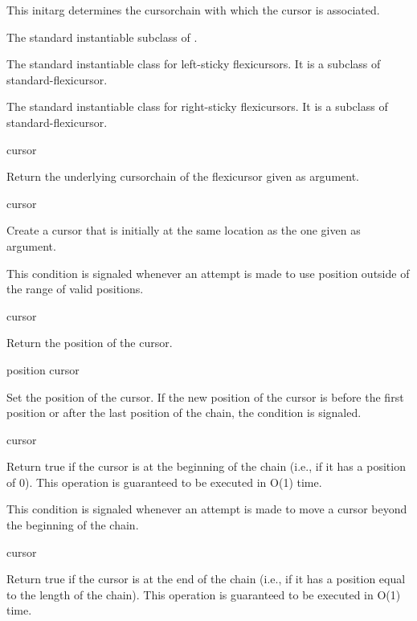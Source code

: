 \documentclass[11pt]{article}
\begin{document}
This initarg determines the cursorchain with which the cursor is associated. 


The standard instantiable subclass of . 


The standard instantiable class for left-sticky flexicursors.  It is a
subclass of standard-flexicursor. 


The standard instantiable class for right-sticky flexicursors.  It is a
subclass of standard-flexicursor. 

 {cursor}

Return the underlying cursorchain of the flexicursor given
as argument. 

 {cursor}

Create a cursor that is initially at the same location as the one
given as argument.  


This condition is signaled whenever an attempt is made to use position
outside of the range of valid positions. 

 {cursor}

Return the position of the cursor.

 {position cursor}

Set the position of the cursor.  If the new position of the cursor is
before the first position or after the last position of the chain, the
condition  is signaled. 

 {cursor}

Return true if the cursor is at the beginning of the chain (i.e., if
it has a position of 0).  This operation is guaranteed to be executed
in O(1) time. 


This condition is signaled whenever an attempt is made to move a
cursor beyond the beginning of the chain. 

 {cursor}

Return true if the cursor is at the end of the chain (i.e., if it has
a position equal to the length of the chain).  This operation is
guaranteed to be executed in O(1) time.
\end{document}
